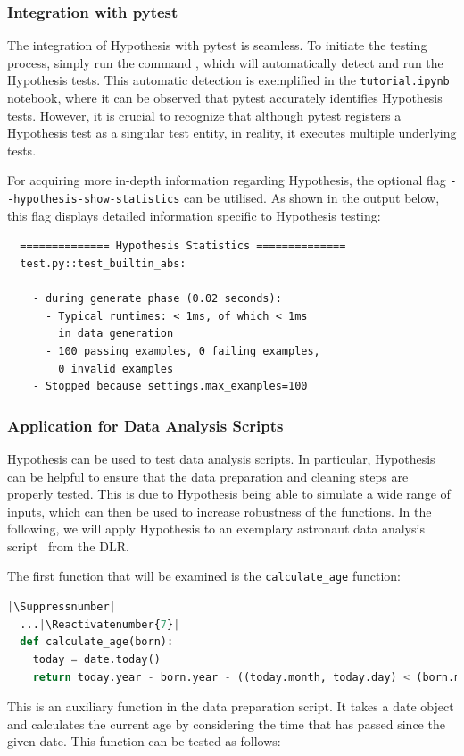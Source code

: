 \documentclass[runningheads]{llncs}
\makeatletter
\let\origthelstnumber\thelstnumber
\newcommand*\Suppressnumber{%
  \lst@AddToHook{OnNewLine}{%
    \let\thelstnumber\relax%
     \advance\c@lstnumber-\@ne\relax%
    }%
}
\newcommand*\Reactivatenumber[1]{%
  \setcounter{lstnumber}{\numexpr#1-1\relax}
  \lst@AddToHook{OnNewLine}{%
   \let\thelstnumber\origthelstnumber%
   \refstepcounter{lstnumber}%
  }%
}
\makeatother
\begin{document}
\subsubsection{Integration with pytest}
The integration of Hypothesis with pytest is seamless. To initiate the testing process, simply run the command , which will automatically detect and run the Hypothesis tests. This automatic detection is exemplified in the \texttt{tutorial.ipynb} notebook, where it can be observed that pytest accurately identifies Hypothesis tests. However, it is crucial to recognize that although pytest registers a Hypothesis test as a singular test entity, in reality, it executes multiple underlying tests.

\vspace{5mm}
\noindent For acquiring more in-depth information regarding Hypothesis, the optional flag \texttt{-{}-hypothesis-show-statistics} can be utilised. As shown in the output below, this flag displays detailed information specific to Hypothesis testing:
\begin{verbatim}
  ============== Hypothesis Statistics ==============
  test.py::test_builtin_abs:

    - during generate phase (0.02 seconds):
      - Typical runtimes: < 1ms, of which < 1ms
        in data generation
      - 100 passing examples, 0 failing examples,
        0 invalid examples
    - Stopped because settings.max_examples=100
\end{verbatim}

\subsubsection{Application for Data Analysis Scripts}
Hypothesis can be used to test data analysis scripts. In particular, Hypothesis can be helpful to ensure that the data preparation and cleaning steps are properly tested. This is due to Hypothesis being able to simulate a wide range of inputs, which can then be used to increase robustness of the functions. In the following, we will apply Hypothesis to an exemplary astronaut data analysis script~\cite{Stoffers2021} from the DLR.

\newpage
\noindent The first function that will be examined is the \texttt{calculate\_age} function:

\begin{lstlisting}[language=Python,caption={Calculate Age from \texttt{data\_analysis.ipynb}}]
  |\Suppressnumber|
  ...|\Reactivatenumber{7}|
  def calculate_age(born):
    today = date.today()
    return today.year - born.year - ((today.month, today.day) < (born.month, born.day))
\end{lstlisting}
This is an auxiliary function in the data preparation script. It takes a date object and calculates the current age by considering the time that has passed since the given date. This function can be tested as follows:
\end{document}
